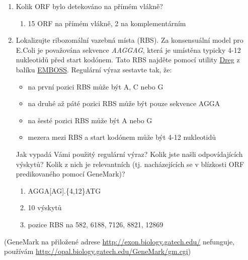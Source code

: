 \documentclass[11pt]{article}
\begin{document}
\begin{enumerate}
\item Kolik ORF bylo detekováno na přímém vlákně?
\begin{enumerate}
\item 15 ORF na přímém vlákně, 2 na komplementárním
\end{enumerate}
\item Lokalizujte ribozomální vazebná místa (RBS). Za konsensuální model pro E.Coli
je považována sekvence \emph{AAGGAG}, která je umístěna typicky 4-12 nukleotidů před
start kodónem. Tato RBS najděte pomocí utility \href{http://emboss.bioinformatics.nl/cgi-bin/emboss/dreg}{Dreg} z balíku
\href{http://emboss.bioinformatics.nl}{EMBOSS}. Regulární výraz sestavte tak, že:

\begin{itemize}
\item na první pozici RBS může být A, C nebo G
\item na druhé až páté pozici RBS může být pouze sekvence AGGA
\item na šesté pozici RBS může být A nebo G
\item mezera mezi RBS a start kodónem může být 4-12 nukleotidů
\end{itemize}

Jak vypadá Vámi použitý regulární výraz? Kolik jste našli odpovídajících
výskytů? Kolik z nich je relevantních (tj.  nacházejících se v blízkosti ORF
predikovaného pomocí GeneMark)?
\begin{enumerate}
\item\relax [ACG]AGGA[AG].\{4,12\}ATG
\item 10 výskytů
\item pozice RBS na 582, 6188, 7126, 8821, 12869
\end{enumerate}
\end{enumerate}

(GeneMark na přiložené adrese \url{http://exon.biology.gatech.edu/} nefunguje,
používám \url{http://opal.biology.gatech.edu/GeneMark/gm.cgi})
\end{document}
